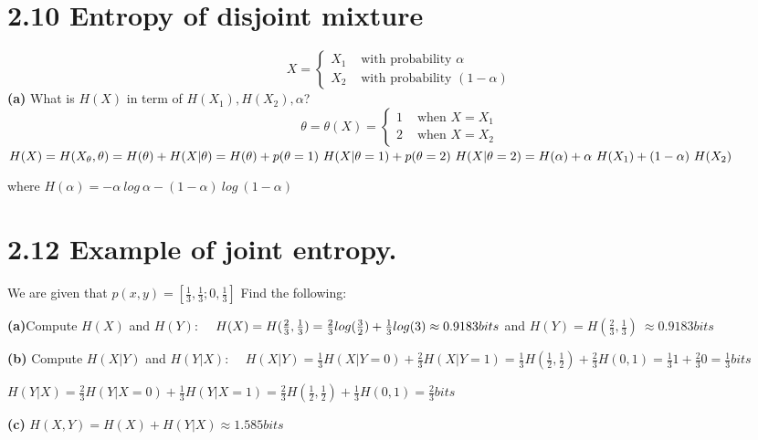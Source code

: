 \documentclass[10pt]{article}
\begin{document}
\begin{tiny}
\begin{multicols}{3}
\section*{2.10 Entropy of disjoint mixture}
\begin{equation*}
X=\begin{cases} 
    X_1 & \text{ with probability } \alpha \\
    X_2 & \text{ with probability } (1-\alpha) 
\end{cases} 
\end{equation*}
\textbf{(a)} What is $H(X)$ in term of $H(X_1), H(X_2), \alpha$? 
\begin{equation}
    \theta = \theta(X) = 
        \begin{cases}
            1 & \text{ when } X=X_{1}\\ 
            2 & \text{ when }  X = X_{2} \end{cases}
    \label{eq: theta of X}
\end{equation}
\(
	H(X) = H(X_\theta,\theta) = H(\theta) + H(X|\theta) \\
	= H(\theta)+p(\theta = 1)\ H(X|\theta=1)+p(\theta=2)\ H(X|\theta=2) \\
	= H(\alpha) + \alpha\ H(X_{1}) + (1-\alpha)\ H(X_{2}) \)

where 
\(H(\alpha) = -\alpha\ log\ \alpha - (1 - \alpha )\ log\ (1-\alpha)\)
             
\section*{2.12 Example of joint entropy.}
We are given that  \( p(x,y)=\left[ \frac{1}{3},\frac{1}{3};0,\frac{1}{3} \right] \) Find the following:

\textbf{(a)}Compute  \(H(X)\) and \( H(Y)\):~~
\(
H(X) = H(\frac{2}{3},\frac{1}{3})
= \frac{2}{3} log(\frac{3}{2}) + \frac{1}{3}log(3)\\
\approx 0.9183 bits \) and \(
H(Y) =  H(\frac{2}{3},\frac{1}{3})\
\approx 0.9183 bits
\)
              
\textbf{(b)} Compute \(H(X|Y)\) and \(H(Y|X)\):~~
\(
H(X|Y) = \frac{1}{3}H(X|Y=0) + \frac{2}{3}H(X|Y=1)
=\frac{1}{3}H(\frac{1}{2},\frac {1}{2})+\frac{2}{3}H(0,1)
=\frac{1}{3}1+\frac{2}{3}0 
= \frac{1}{3} bits \) 
                
\(
H(Y|X) = \frac{2}{3}H(Y|X=0)+\frac{1}{3}H(Y|X=1)
=\frac{2}{3}H(\frac{1}{2},\frac{1}{2}) + \frac{1}{3}H(0,1)
=\frac{2}{3} bits
\)
              
\textbf{(c)}
\(
H(X,Y)=H(X)+H(Y|X)
\approx 1.585 bits
\)
          	  

\end{multicols}
\end{tiny}
\end{document}
